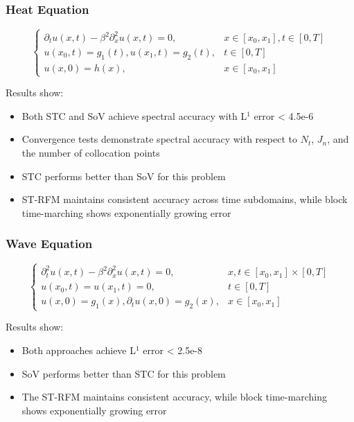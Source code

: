 \documentclass[11pt]{article}
\begin{document}
\subsubsection{Heat Equation}
\begin{equation}
\begin{cases}
\partial_t u(x,t) - \beta^2 \partial^2_x u(x,t) = 0, & x \in [x_0, x_1], t \in [0,T] \\
u(x_0, t) = g_1(t), u(x_1, t) = g_2(t), & t \in [0,T] \\
u(x, 0) = h(x), & x \in [x_0, x_1]
\end{cases}
\end{equation}

Results show:
\begin{itemize}
    \item Both STC and SoV achieve spectral accuracy with L$^1$ error < 4.5e-6
    \item Convergence tests demonstrate spectral accuracy with respect to $N_t$, $J_n$, and the number of collocation points
    \item STC performs better than SoV for this problem
    \item ST-RFM maintains consistent accuracy across time subdomains, while block time-marching shows exponentially growing error
\end{itemize}

\subsubsection{Wave Equation}
\begin{equation}
\begin{cases}
\partial^2_t u(x,t) - \beta^2 \partial^2_x u(x,t) = 0, & x, t \in [x_0, x_1] \times [0,T] \\
u(x_0, t) = u(x_1, t) = 0, & t \in [0,T] \\
u(x, 0) = g_1(x), \partial_t u(x, 0) = g_2(x), & x \in [x_0, x_1]
\end{cases}
\end{equation}

Results show:
\begin{itemize}
    \item Both approaches achieve L$^1$ error < 2.5e-8
    \item SoV performs better than STC for this problem
    \item The ST-RFM maintains consistent accuracy, while block time-marching shows exponentially growing error
\end{itemize}
\end{document}
